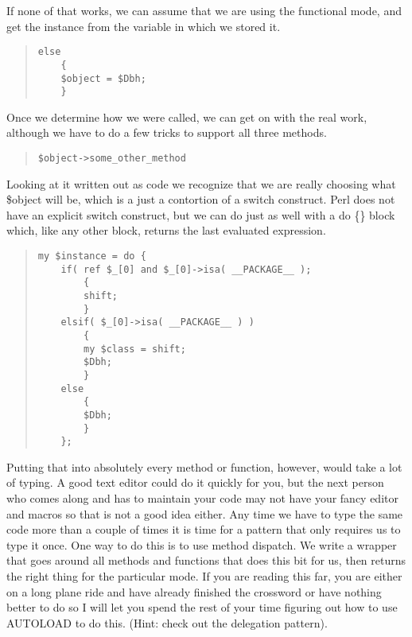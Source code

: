 If none of that works, we can assume that we are using the functional
mode, and get the instance from the variable in which we stored it.

\begin{quote}    
\begin{verbatim}
else
    {
    $object = $Dbh;
    }
\end{verbatim}
\end{quote}
            
Once we determine how we were called, we can get on with the real work,
although we have to do a few tricks to support all three methods.

\begin{quote}    
\begin{verbatim}
$object->some_other_method
\end{verbatim}
\end{quote}

Looking at it written out as code we recognize that we are
really choosing what \$object will be, which is a just a
contortion of a switch construct.  Perl does not have an
explicit switch construct, but we can do just as well with
a do \{\} block which, like any other block, returns the
last evaluated expression.

\begin{quote}    
\begin{verbatim}
my $instance = do {
    if( ref $_[0] and $_[0]->isa( __PACKAGE__ );
        {
        shift;
        }        
    elsif( $_[0]->isa( __PACKAGE__ ) )
        {
        my $class = shift;
        $Dbh;
        }
    else
        {
        $Dbh;
        }
    };    
\end{verbatim}
\end{quote}

Putting that into absolutely every method or function, however, 
would take a lot of typing.  A good text editor could do it
quickly for you, but  the next person who comes along  and has
to maintain your code may not have your fancy editor and macros
so that is not a good idea either.  Any time we have to type the
same code more than a couple of times it is time for a pattern
that only requires us to type it once. One way to do this is to 
use method dispatch.  We write a wrapper that goes around all
methods and functions that does this bit for us, then returns 
the right thing for the particular mode.  If you are reading
this far, you are either on a long plane ride and have already 
finished the crossword or have nothing better to do so I will
let you spend the rest of your time figuring out how to use 
AUTOLOAD to do this.  (Hint: check out the delegation pattern).
    
